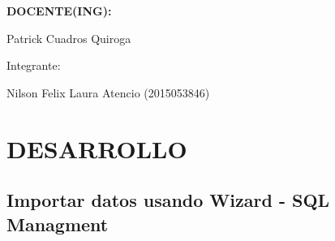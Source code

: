 \documentclass[12pt,letterpaper]{article}
\begin{document}
\begin{titlepage}
\begin{center}
\vspace*{0.3in}
\begin{Large}
\textbf{DOCENTE(ING):} \\
\end{Large}

\vspace*{0.1in}
\begin{large}
 Patrick Cuadros Quiroga\\
\end{large}

\vspace*{0.2in}
\vspace*{0.1in}
\begin{large}
Integrante: \\
\begin{flushleft}
Nilson Felix Laura Atencio	\hfill	(2015053846) 
\end{flushleft}
\end{large}
\end{center}

\end{titlepage}



\thispagestyle{empty} %
\newpage
\setcounter{page}{1} %


\section{DESARROLLO}
\subsection{Importar datos usando Wizard - SQL Managment}
\end{document}
